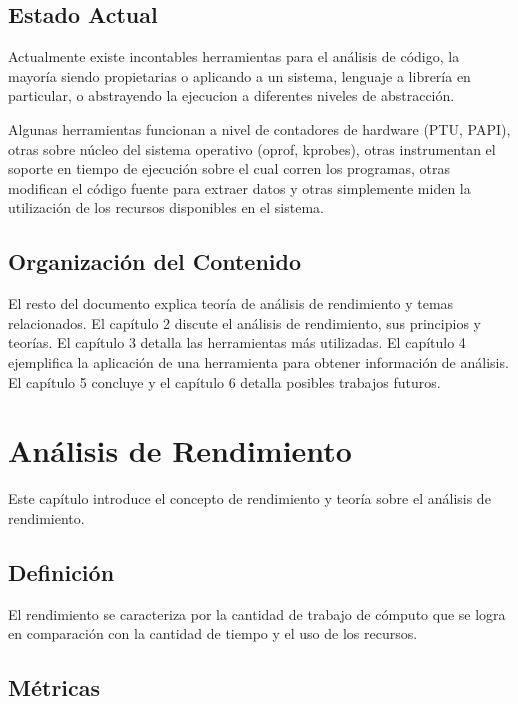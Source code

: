 \documentclass[a4paper]{report}
\begin{document}
\section{Estado Actual}

Actualmente existe incontables herramientas para el an\'alisis de c\'odigo, la
mayor\'ia siendo propietarias o aplicando a un sistema, lenguaje a librer\'ia
en particular, o abstrayendo la ejecucion a diferentes niveles de
abstracci\'on.

\bigskip

Algunas herramientas funcionan a nivel de contadores de hardware (PTU, PAPI),
otras sobre n\'ucleo del sistema operativo (oprof, kprobes), otras
instrumentan el soporte en tiempo de ejecuci\'on sobre el cual corren los
programas, otras modifican el c\'odigo fuente para extraer datos y otras
simplemente miden la utilizaci\'on de los recursos disponibles en el sistema.

\section{Organizaci\'on del Contenido}

El resto del documento explica teor\'ia de an\'alisis de rendimiento y temas
relacionados. El cap\'itulo 2 discute el an\'alisis de rendimiento, sus
principios y teor\'ias. El cap\'itulo 3 detalla las herramientas m\'as
utilizadas. El cap\'itulo 4 ejemplifica la aplicaci\'on de una herramienta
para obtener informaci\'on de an\'alisis. El cap\'itulo 5 concluye y el
cap\'itulo 6 detalla posibles trabajos futuros.

\chapter{An\'alisis de Rendimiento}

Este cap\'itulo introduce el concepto de rendimiento y teor\'ia sobre el
an\'alisis de rendimiento.

\section{Definici\'on}

El rendimiento se caracteriza por la cantidad de trabajo de c\'omputo que se
logra en comparaci\'on con la cantidad de tiempo y el uso de los recursos.

\section{M\'etricas}
\end{document}
